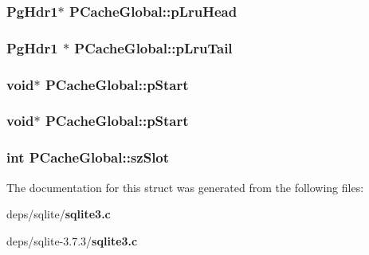 \subsubsection{\setlength{\rightskip}{0pt plus 5cm}\bf{Pg\-Hdr1}$\ast$ \bf{PCache\-Global::p\-Lru\-Head}}\label{structPCacheGlobal_59b52b4e0657ffca9237c588afe3cf3a}


\subsubsection{\setlength{\rightskip}{0pt plus 5cm}\bf{Pg\-Hdr1} $\ast$ \bf{PCache\-Global::p\-Lru\-Tail}}\label{structPCacheGlobal_2b98a3dfb9f441ffeaa7d8a8c7455068}


\subsubsection{\setlength{\rightskip}{0pt plus 5cm}void$\ast$ \bf{PCache\-Global::p\-Start}}\label{structPCacheGlobal_80f8ab370f7bad3a2c77ede3d10179dc}


\subsubsection{\setlength{\rightskip}{0pt plus 5cm}void$\ast$ \bf{PCache\-Global::p\-Start}}\label{structPCacheGlobal_80f8ab370f7bad3a2c77ede3d10179dc}


\subsubsection{\setlength{\rightskip}{0pt plus 5cm}int \bf{PCache\-Global::sz\-Slot}}\label{structPCacheGlobal_e46e9e1967dc471b9493d3aa7f5e8b42}




The documentation for this struct was generated from the following files:\begin{CompactItemize}
\item 
deps/sqlite/\bf{sqlite3.c}\item 
deps/sqlite-3.7.3/\bf{sqlite3.c}\end{CompactItemize}
